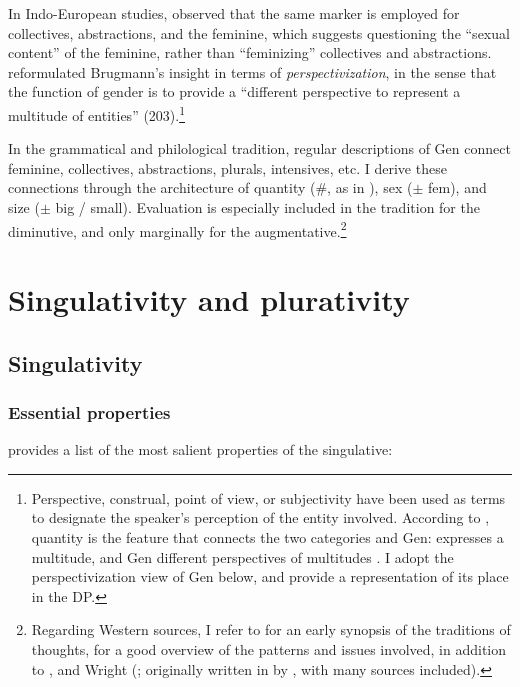 In Indo-European studies, \citet{Brugmann1897} observed that the same marker is
employed for collectives, abstractions, and the feminine, which suggests
questioning the ``sexual content'' of the feminine, rather than ``feminizing''
collectives and abstractions. \citet{Leiss1994} reformulated Brugmann's insight
in terms of \textit{perspectivization}, in the sense that the function of
gender is to provide a ``different perspective to represent a multitude of
entities'' (203).\footnote{Perspective, construal, point of view, or
subjectivity have been used as terms to designate the speaker's perception of
the entity involved. According to \citet{Unterbeck2000}, quantity is the
feature that connects the two categories  and Gen:  expresses a
multitude, and Gen different perspectives of multitudes \citep[see
also][]{Hachimi2007}. I adopt the perspectivization view of Gen below, and
provide a representation of its place in the DP.}

In the  grammatical and philological tradition, regular descriptions of
Gen connect feminine, collectives, abstractions, plurals, intensives, etc. I
derive these connections through the architecture of quantity (\#, as in
\citealt{Borer2005}), sex ($\pm$ fem), and size ($\pm$ big / small). Evaluation
is especially included in the  tradition for the diminutive, and only
marginally for the augmentative.\footnote{Regarding Western sources, I refer to
\citet{Ibrahim1973} for an early synopsis of the traditions of thoughts,
\citet{Hachimi2007} for a good overview of the patterns and issues involved, in
addition to \citet{Fleisch1961,Roman1990}, and Wright (\citeyear{Wright1971};
originally written in  by \citet{Caspari1859}, with many  sources
included).}
  

\section{Singulativity and plurativity}\label{sec:fassi:singulativity}

\subsection{Singulativity}

\subsubsection{Essential properties}

\citet{FassiFehri2016} provides a list of the most salient properties of the
singulative:

